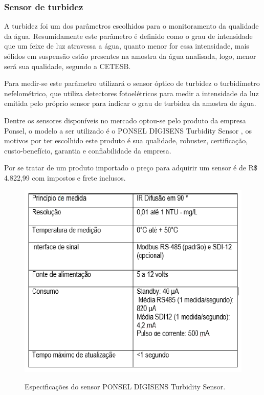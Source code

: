 \subsubsection{Sensor de turbidez}

  A turbidez foi um dos parâmetros escolhidos para o monitoramento da qualidade da água. Resumidamente este parâmetro é definido como o grau de intensidade que um feixe de luz atravessa a água, quanto menor for essa intensidade, mais sólidos em suspensão estão presentes na amostra da água analisada, logo, menor será sua qualidade, segundo a CETESB.
  
  Para medir-se este parâmetro utilizará o sensor óptico de turbidez o turbidímetro nefelométrico, que utiliza detectores fotoelétricos para medir a intensidade da luz emitida pelo próprio sensor para indicar o grau de turbidez da amostra de água.
  
  Dentre os sensores disponíveis no mercado optou-se pelo produto da empresa Ponsel, o modelo a ser utilizado é o PONSEL DIGISENS Turbidity Sensor \footnotemark, os motivos por ter escolhido este produto é sua qualidade, robustez, certificação, custo-benefício, garantia e confiabilidade da empresa.
  
  Por se tratar de um produto importado o preço para adquirir um sensor é de R\$ 4.822,99 com impostos e frete inclusos.
  
  \begin{figure}[!h]
    \centering
    \includegraphics[scale = 0.5]{editaveis/figuras/turbidez_spec}
    \label{fishbone}
    \caption[Especificações do sensor PONSEL DIGISENS Turbidity Sensor]
      {Especificações do sensor PONSEL DIGISENS Turbidity Sensor. \footnotemark}
  \end{figure}
  \FloatBarrier
  